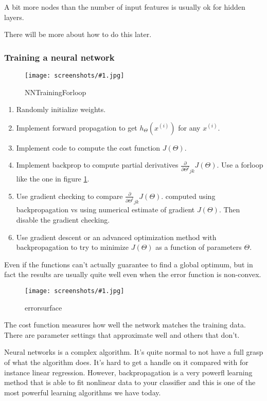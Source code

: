 \documentclass[a4, 12pt, english, USenglish]{scrreprt}
\newcommand{\screenshot}[2]{
\begin{figure}[htb]
\texttt{[image: screenshots/\#1.jpg]}
\label{#1}
\caption{#2}
\end{figure}}
\begin{document}
A bit more nodes than the number of input features is usually ok for
hidden layers.

There will be more about how to do this later.

\subsubsection{Training a neural network}



\screenshot{NNTrainingForloop}{NNTrainingForloop}

\begin{enumerate}
\item Randomly initialize weights.
\item Implement forward propagation to get \(h_\Theta(x^{(i)})\) for
  any \(x^{(i)}\).
\item Implement code to compute the cost function \(J(\Theta)\).
\item Implement backprop to compute partial derivatives
  \(\frac{\partial}{\partial \Theta^{l}}_{jk} J(\Theta)\). Use a
  forloop like the one in figure \ref{NNTrainingForloop}.
\item Use gradient checking to compare \(\frac{\partial}{\partial
    \Theta^{l}}_{jk} J(\Theta)\). computed using backpropagation vs
  using numerical estimate of gradient \(J(\Theta)\).  Then disable
  the gradient checking.
\item Use gradient descent or an advanced optimization method with
  backpropagation to try to minimize \(J(\Theta)\) as a function of
  parameters \(\Theta\).
\end{enumerate}


Even if the functions can't actually guarantee to find a global
optimum, but in fact the results are usually quite well even when the
error function is non-convex.

\screenshot{errorsurface}{errorsurface}

The cost function measures how well the network matches the training
data.   There are parameter settings that approximate well and others
that don't.   

Neural networks is a complex algorithm.   It's quite normal to not
have a full grasp of what the algorithm does.  It's hard to get a
handle on it compared with for instance linear regression.  However,
backpropagation is a very powerfl learning method that is able to fit
nonlinear data to your classifier and this is one of the most powerful
learning algorithms we have today.
\end{document}
